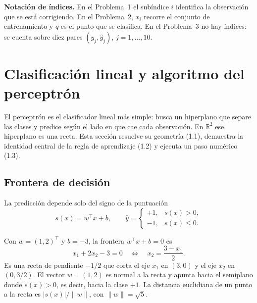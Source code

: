 \documentclass[12pt,a4paper]{article}
\newcommand{\R}{\mathbb{R}}
\newcommand{\norm}[1]{\lVert #1\rVert}
\newcommand{\abs}[1]{\lvert #1\rvert}
\begin{document}
\begin{cajaVar}
  \textbf{Notación de índices.} En el Problema~1 el subíndice $i$ identifica la
  observación que se está corrigiendo. En el Problema~2, $x_i$ recorre el
  conjunto de entrenamiento y $q$ es el punto que se clasifica. En el
  Problema~3 no hay índices: se cuenta sobre diez pares
  $(y_j,\hat{y}_j)$, $j=1,\dots,10$.
\end{cajaVar}

\section{Clasificación lineal y algoritmo del perceptrón}

El perceptrón es el clasificador lineal más simple: busca un hiperplano que
separe las clases y predice según el lado en que cae cada observación. En
$\R^2$ ese hiperplano es una recta. Esta sección resuelve su geometría (1.1),
demuestra la identidad central de la regla de aprendizaje (1.2) y ejecuta un
paso numérico (1.3).

\subsection{Frontera de decisión}

La predicción depende solo del signo de la puntuación
\begin{equation}
  s(x)=w^\top x+b,
  \qquad
  \hat{y}=
  \begin{cases}
    +1, & s(x)>0,\\
    -1, & s(x)\leq 0.
  \end{cases}
  \label{eq:regla}
\end{equation}

Con $w=(1,2)^\top$ y $b=-3$, la frontera $w^\top x+b=0$ es
\begin{equation}
  x_1+2x_2-3=0
  \quad\Longleftrightarrow\quad
  x_2=\frac{3-x_1}{2}.
  \label{eq:frontera}
\end{equation}
Es una recta de pendiente $-1/2$ que corta el eje $x_1$ en $(3,0)$ y el eje
$x_2$ en $(0,3/2)$. El vector $w=(1,2)$ es normal a la recta y apunta hacia el
semiplano donde $s(x)>0$, es decir, hacia la clase $+1$. La distancia
euclidiana de un punto a la recta es $\abs{s(x)}/\norm{w}$, con
$\norm{w}=\sqrt{5}$.
\end{document}
